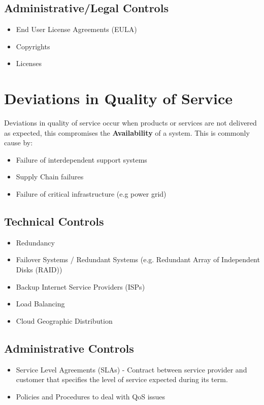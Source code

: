 \documentclass[12pt letter]{report}
\begin{document}
\subsection{Administrative/Legal Controls}

\begin{itemize}
  \item  End User License Agreements (EULA)
  \item Copyrights
  \item Licenses
\end{itemize}

\section{Deviations in Quality of Service}

Deviations in quality of service occur when products or services are not delivered as expected, this compromises the \textbf{Availability} of a system. This is commonly cause by:
\begin{itemize}
  \item Failure of interdependent support systems
  \item Supply Chain failures
  \item Failure of critical infrastructure (e.g power grid)
\end{itemize}

\subsection{Technical Controls}
\begin{itemize}
  \item Redundancy
  \item Failover Systems / Redundant Systems (e.g. Redundant Array of Independent Disks (RAID))
  \item Backup Internet Service Providers (ISPs)
  \item Load Balancing
  \item Cloud Geographic Distribution
\end{itemize}

\subsection{Administrative Controls}
\begin{itemize}
  \item Service Level Agreements (SLAs) - Contract between service provider and customer that specifies the level of service expected during its term.
  \item Policies and Procedures to deal with QoS issues
\end{itemize}
\end{document}
